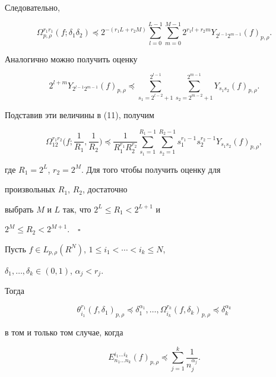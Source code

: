 Следовательно, 


\begin{equation} 


\Omega^{r_1r_1}_{p,\rho}(f;\delta_1\delta_2)\preceq 


2^{-(r_1L+r_2M)}\sum^{L-1}_{l=0}\sum^{M-1}_{m=0} 


2^{r_1l+r_2m}Y_{2^{l-1}2^{m-1}}(f)_{p,\rho}. 


\end{equation} 


Аналогично можно получить оценку 


$$


2^{l+m}Y_{2^{l-1}2^{m-1}}(f)_{p,\rho}\preceq 


\sum^{2^{l-1}}_{s_1=2^{l-2}+1}\sum^{2^{m-1}}_{s_2=2^{m-2}+1} 


Y_{s_1s_2}(f)_{p,\rho}. 


$$


Подставив эти величины в (11), получим 


$$ 


\Omega^{r_1r_2}_{12}\bigg(f;\frac{1}{R_1},\frac{1}{R_2} \bigg) 


\preceq\frac{1}{R^{r_1}_1R^{r_2}_2}\sum^{R_1-1}_{s_1=1} 


\sum^{R_2-1}_{s_2=1}s^{r_1-1}_1s^{r_2-1}_2 Y_{s_1s_2}


(f)_{p,\rho}, 


$$ 


где $R_1=2^L$, $r_2=2^M$. Для того чтобы получить оценку для 


произвольных $R_1$, $R_2$, достаточно 


выбрать $M$ и $L$ так, что $2^L\le R_1<2^{L+1}$ и


$2^M\le R_2<2^{M+1}.\quad\square$ 


 


\begin{cor} 


Пусть $f\in L_{p,\rho}(R^N)$, $1\le i_1<\dotsb<i_k\le N$, 


$\delta_1,\dotsc,\delta_k\in(0,1)$, $\alpha_j<r_j$. 


Тогда 


$$ 


\theta^{r_1}_{i_1}(f,\delta_1)_{p,\rho}\preceq 


\delta^{\alpha_1}_1,\dotsc,\Omega^{r_k}_{i_k}(f,\delta_k 


)_{p,\rho}\preceq\delta^{\alpha_k}_k 


$$ 


в том и только том случае, когда 


$$ 


E^{i_1\dotsc i_k}_{n_1\dotsc n_k}(f)_{p,\rho}\preceq 


\sum^k_{j=1}\frac{1}{n^{\alpha_j}_j}. 


$$ 


\end{cor} 


